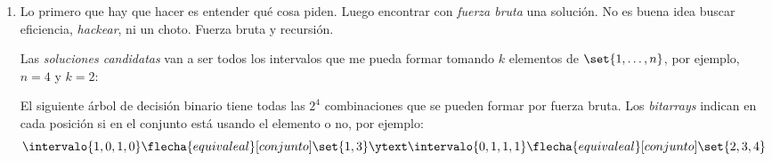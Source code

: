 \begin{enumerate}[label=$\alph*)$]
  \item Lo primero que hay que hacer es entender qué cosa piden. Luego encontrar con \textit{fuerza bruta} una solución. No es
        buena idea buscar eficiencia, \textit{hackear}, ni un choto. Fuerza bruta y recursión.

        Las \textit{soluciones candidatas} van a ser todos los intervalos que me pueda formar tomando $k$ elementos de $\set{1,\ldots, n}$,
        por ejemplo, $n=4$ y $k=2$:

        El siguiente árbol de decisión binario tiene todas las $2^4$ combinaciones que se pueden formar por fuerza bruta.
        Los \textit{bitarrays} indican en cada posición si en el conjunto está usando el elemento o no, por ejemplo:
        $$
          \intervalo{1,0,1,0} \flecha{equivale al}[conjunto] \set{1,3}
          \ytext
          \intervalo{0,1,1,1} \flecha{equivale al}[conjunto] \set{2,3,4}
        $$


\end{enumerate}
